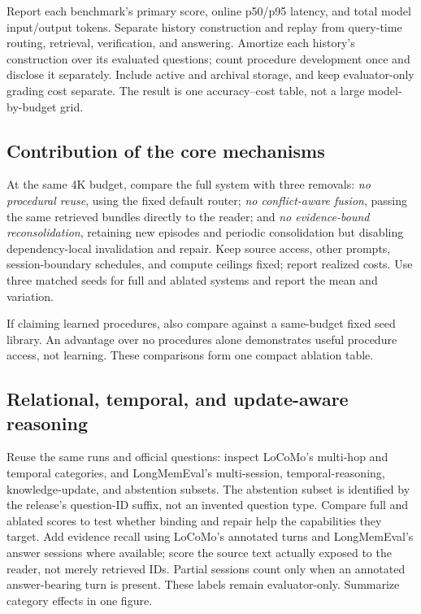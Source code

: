 \documentclass{article}
\begin{document}
Report each benchmark's primary score, online p50/p95 latency, and total
model input/output tokens. Separate history construction and replay from
query-time routing, retrieval, verification, and answering. Amortize each
history's construction over its evaluated questions; count procedure
development once and disclose it separately. Include active and archival
storage, and keep evaluator-only grading cost separate. The result is one
accuracy--cost table, not a large model-by-budget grid.

\subsection{Contribution of the core mechanisms}
At the same 4K budget, compare the full system with three removals:
\emph{no procedural reuse}, using the fixed default router;
\emph{no conflict-aware fusion}, passing the same retrieved bundles directly
to the reader; and \emph{no evidence-bound reconsolidation}, retaining new
episodes and periodic consolidation but disabling dependency-local
invalidation and repair. Keep source access, other prompts, session-boundary
schedules, and compute ceilings fixed; report realized costs. Use three
matched seeds for full and ablated systems and report the mean and variation.

If claiming learned procedures, also compare against a same-budget fixed seed
library. An advantage over no procedures alone demonstrates useful procedure
access, not learning. These comparisons form one compact ablation table.

\subsection{Relational, temporal, and update-aware reasoning}
Reuse the same runs and official questions: inspect LoCoMo's multi-hop and
temporal categories, and LongMemEval's multi-session, temporal-reasoning,
knowledge-update, and abstention subsets. The abstention subset is identified
by the release's question-ID suffix, not an invented question type.
Compare full and ablated scores to test whether binding and repair help the
capabilities they target. Add evidence recall using LoCoMo's annotated turns
and LongMemEval's answer sessions where available; score the source text
actually exposed to the reader, not merely retrieved IDs. Partial sessions
count only when an annotated answer-bearing turn is present. These labels
remain evaluator-only. Summarize category effects in one figure.
\end{document}
